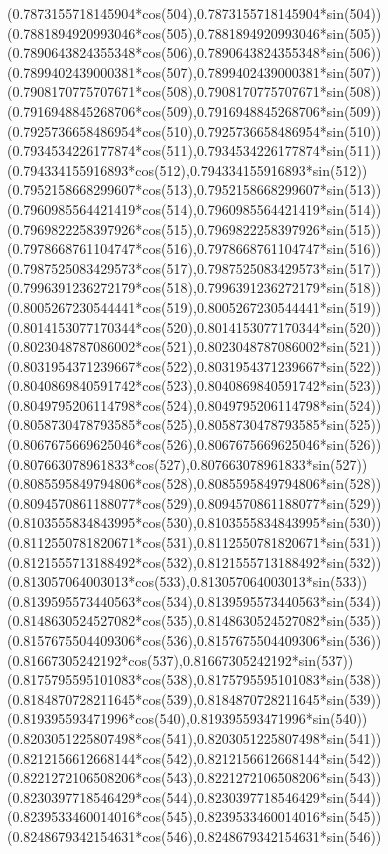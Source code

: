 {({0.7873155718145904*cos(504)},{0.7873155718145904*sin(504)})
({0.7881894920993046*cos(505)},{0.7881894920993046*sin(505)})
({0.7890643824355348*cos(506)},{0.7890643824355348*sin(506)})
({0.7899402439000381*cos(507)},{0.7899402439000381*sin(507)})
({0.7908170775707671*cos(508)},{0.7908170775707671*sin(508)})
({0.7916948845268706*cos(509)},{0.7916948845268706*sin(509)})
({0.7925736658486954*cos(510)},{0.7925736658486954*sin(510)})
({0.7934534226177874*cos(511)},{0.7934534226177874*sin(511)})
({0.794334155916893*cos(512)},{0.794334155916893*sin(512)})
({0.7952158668299607*cos(513)},{0.7952158668299607*sin(513)})
({0.7960985564421419*cos(514)},{0.7960985564421419*sin(514)})
({0.7969822258397926*cos(515)},{0.7969822258397926*sin(515)})
({0.7978668761104747*cos(516)},{0.7978668761104747*sin(516)})
({0.7987525083429573*cos(517)},{0.7987525083429573*sin(517)})
({0.7996391236272179*cos(518)},{0.7996391236272179*sin(518)})
({0.8005267230544441*cos(519)},{0.8005267230544441*sin(519)})
({0.8014153077170344*cos(520)},{0.8014153077170344*sin(520)})
({0.8023048787086002*cos(521)},{0.8023048787086002*sin(521)})
({0.8031954371239667*cos(522)},{0.8031954371239667*sin(522)})
({0.8040869840591742*cos(523)},{0.8040869840591742*sin(523)})
({0.8049795206114798*cos(524)},{0.8049795206114798*sin(524)})
({0.8058730478793585*cos(525)},{0.8058730478793585*sin(525)})
({0.8067675669625046*cos(526)},{0.8067675669625046*sin(526)})
({0.807663078961833*cos(527)},{0.807663078961833*sin(527)})
({0.8085595849794806*cos(528)},{0.8085595849794806*sin(528)})
({0.8094570861188077*cos(529)},{0.8094570861188077*sin(529)})
({0.8103555834843995*cos(530)},{0.8103555834843995*sin(530)})
({0.8112550781820671*cos(531)},{0.8112550781820671*sin(531)})
({0.8121555713188492*cos(532)},{0.8121555713188492*sin(532)})
({0.813057064003013*cos(533)},{0.813057064003013*sin(533)})
({0.8139595573440563*cos(534)},{0.8139595573440563*sin(534)})
({0.8148630524527082*cos(535)},{0.8148630524527082*sin(535)})
({0.8157675504409306*cos(536)},{0.8157675504409306*sin(536)})
({0.81667305242192*cos(537)},{0.81667305242192*sin(537)})
({0.8175795595101083*cos(538)},{0.8175795595101083*sin(538)})
({0.8184870728211645*cos(539)},{0.8184870728211645*sin(539)})
({0.819395593471996*cos(540)},{0.819395593471996*sin(540)})
({0.8203051225807498*cos(541)},{0.8203051225807498*sin(541)})
({0.8212156612668144*cos(542)},{0.8212156612668144*sin(542)})
({0.8221272106508206*cos(543)},{0.8221272106508206*sin(543)})
({0.8230397718546429*cos(544)},{0.8230397718546429*sin(544)})
({0.8239533460014016*cos(545)},{0.8239533460014016*sin(545)})
({0.8248679342154631*cos(546)},{0.8248679342154631*sin(546)})
}
